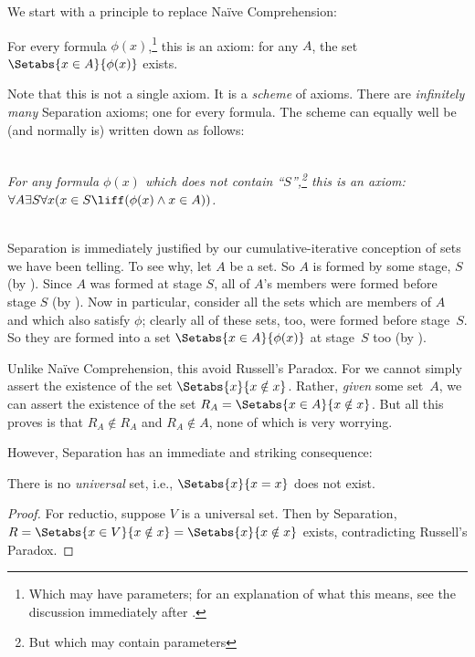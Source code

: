 \documentclass[../../../include/open-logic-section]{subfiles}
\begin{document}

We start with a principle to replace Na\"{i}ve Comprehension:

\begin{axiom} For every formula
$\phi(x)$,\footnote{Which may have parameters; for an explanation of
what this means, see the discussion immediately after
.} this is an
axiom: for any $A$, the set $\Setabs{x \in A}{\phi(x)}$ exists.
\end{axiom}

Note that this is not a single axiom. It is a \emph{scheme} of axioms.
There are \emph{infinitely many} Separation axioms; one for every
formula. The scheme can equally well be (and normally is) written down
as follows:

\ \\\emph{For any formula $\phi(x)$ which does not contain
``$S$'',\footnote{But which may contain parameters} this is an axiom:
\\$\forall A \exists S \forall x(x \in S \liff (\phi(x) \land x \in
A))$.}

\ \\Separation is immediately justified by our cumulative-iterative
conception of sets we have been telling. To see why, let $A$ be a set.
So $A$ is formed by some stage, $S$ (by \stageshier). Since $A$ was
formed at stage $S$, all of $A$'s members were formed before stage $S$
(by \stagesacc). Now in particular, consider all the sets which are
members of $A$ and which also satisfy $\phi$; clearly all of these
sets, too, were formed before stage~$S$. So they are formed into a set
$\Setabs{x \in A}{\phi(x)}$ at stage~$S$ too (by \stagesacc). 

Unlike Na\"ive Comprehension, this avoid Russell's Paradox. For we
cannot simply assert the existence of the set $\Setabs{x}{x \notin
x}$. Rather, \emph{given} some set~$A$, we can assert the existence of
the set $R_A = \Setabs{x \in A}{x \notin x}$. But all this proves is
that $R_A \notin R_A$ and $R_A \notin A$, none of which is very
worrying. 

However, Separation has an immediate and striking consequence:

\begin{thm}
There is no \emph{universal} set, i.e., $\Setabs{x}{x = x}$ does not exist.
\end{thm}

\begin{proof}
For reductio, suppose $V$ is a universal set. Then by Separation, $R =
\Setabs{x \in V}{x \notin x} = \Setabs{x}{x \notin x}$ exists,
contradicting Russell's Paradox.
\end{proof}
\end{document}
